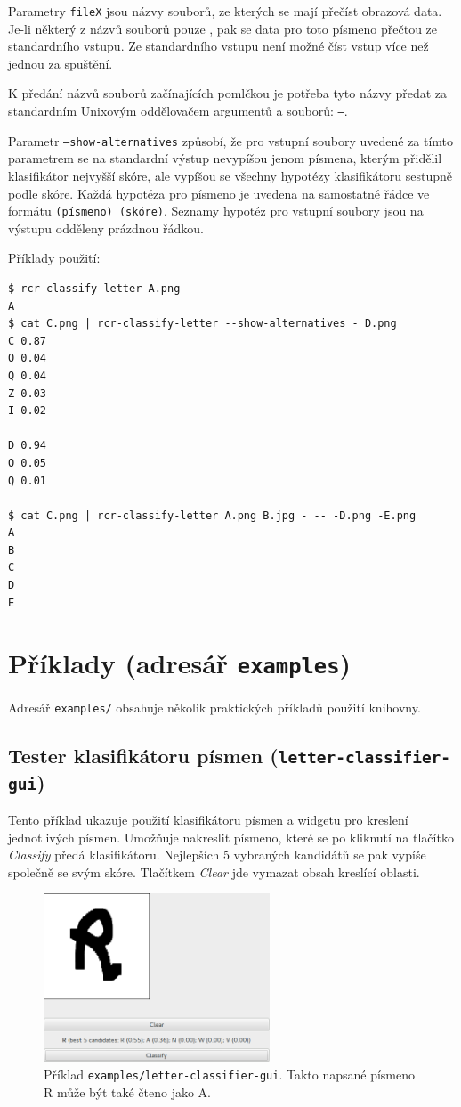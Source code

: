 \documentclass[a4paper]{article}
\begin{document}
Parametry \texttt{fileX} jsou názvy souborů, ze kterých se mají přečíst
obrazová data. Je-li některý z názvů souborů pouze \uv{\texttt{-}}, pak se data
pro toto písmeno přečtou ze standardního vstupu. Ze standardního vstupu
není možné číst vstup více než jednou za spuštění.

K předání názvů souborů začínajících pomlčkou je potřeba tyto názvy předat
za standardním Unixovým oddělovačem argumentů a souborů: \texttt{--}.

Parametr \texttt{--show-alternatives} způsobí, že pro vstupní soubory
uvedené za tímto parametrem se na standardní výstup nevypíšou jenom
písmena, kterým přidělil klasifikátor nejvyšší skóre, ale vypíšou se
všechny hypotézy klasifikátoru sestupně podle skóre. Každá hypotéza
pro písmeno je uvedena na samostatné řádce ve formátu \texttt{(písmeno)
(skóre)}. Seznamy hypotéz pro vstupní soubory jsou na výstupu odděleny prázdnou
řádkou.

Příklady použití:
\begin{lstlisting}
$ rcr-classify-letter A.png
A
$ cat C.png | rcr-classify-letter --show-alternatives - D.png
C 0.87
O 0.04
Q 0.04
Z 0.03
I 0.02

D 0.94
O 0.05
Q 0.01

$ cat C.png | rcr-classify-letter A.png B.jpg - -- -D.png -E.png
A
B
C
D
E
\end{lstlisting}

\section{Příklady (adresář \texttt{examples})}
Adresář \texttt{examples/} obsahuje několik praktických příkladů použití knihovny.

\subsection{Tester klasifikátoru písmen (\texttt{letter-classifier-gui})}
Tento příklad ukazuje použití klasifikátoru písmen a widgetu pro kreslení
jednotlivých písmen. Umožňuje nakreslit písmeno, které se po kliknutí na
tlačítko \textit{Classify} předá klasifikátoru. Nejlepších 5 vybraných kandidátů
se pak vypíše společně se svým skóre. Tlačítkem \textit{Clear} jde vymazat obsah
kreslící oblasti.

\begin{figure}[h]
\centering
\includegraphics[width=0.6\textwidth]{letter_classifier_gui}
\caption{Příklad \texttt{examples/letter-classifier-gui}. Takto napsané písmeno R může být také čteno jako A.}
\end{figure}
\end{document}
